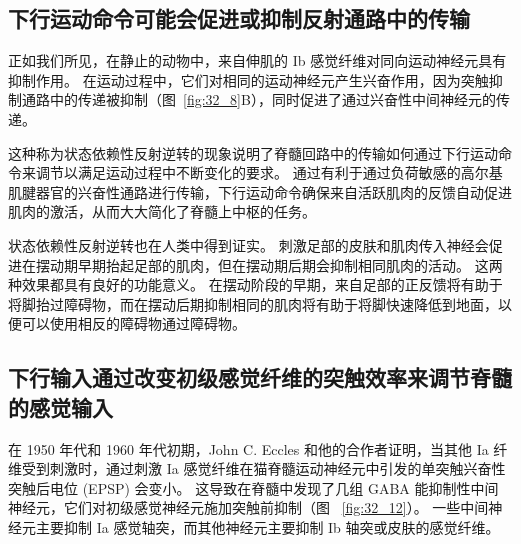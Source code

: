 \subsection{下行运动命令可能会促进或抑制反射通路中的传输}

正如我们所见，在静止的动物中，来自伸肌的 Ib 感觉纤维对同向运动神经元具有抑制作用。
在运动过程中，它们对相同的运动神经元产生兴奋作用，因为突触抑制通路中的传递被抑制（图~\ref{fig:32_8}B），同时促进了通过兴奋性中间神经元的传递。


这种称为状态依赖性反射逆转的现象说明了脊髓回路中的传输如何通过下行运动命令来调节以满足运动过程中不断变化的要求。
通过有利于通过负荷敏感的高尔基肌腱器官的兴奋性通路进行传输，下行运动命令确保来自活跃肌肉的反馈自动促进肌肉的激活，从而大大简化了脊髓上中枢的任务。


状态依赖性反射逆转也在人类中得到证实。
刺激足部的皮肤和肌肉传入神经会促进在摆动期早期抬起足部的肌肉，但在摆动期后期会抑制相同肌肉的活动。
这两种效果都具有良好的功能意义。
在摆动阶段的早期，来自足部的正反馈将有助于将脚抬过障碍物，而在摆动后期抑制相同的肌肉将有助于将脚快速降低到地面，以便可以使用相反的障碍物通过障碍物。



\subsection{下行输入通过改变初级感觉纤维的突触效率来调节脊髓的感觉输入}

在 1950 年代和 1960 年代初期，John C. Eccles 和他的合作者证明，当其他 Ia 纤维受到刺激时，通过刺激 Ia 感觉纤维在猫脊髓运动神经元中引发的单突触兴奋性突触后电位 (EPSP) 会变小。
这导致在脊髓中发现了几组 GABA 能抑制性中间神经元，它们对初级感觉神经元施加突触前抑制（图 ~\ref{fig:32_12}）。 
一些中间神经元主要抑制 Ia 感觉轴突，而其他神经元主要抑制 Ib 轴突或皮肤的感觉纤维。


